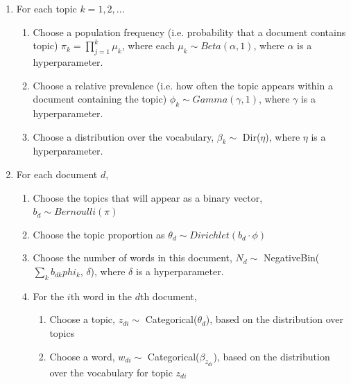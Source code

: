 \documentclass{article}
\begin{document}
\begin{enumerate}
\item For each topic $k = 1, 2, ...$
\begin{enumerate}
\item Choose a population frequency (i.e. probability that a document contains topic) $\pi_k = \prod^k_{j=1} \mu_k$, where each $\mu_k \sim Beta(\alpha, 1)$, where $\alpha$ is a hyperparameter.
\item Choose a relative prevalence (i.e. how often the topic appears within a document containing the topic) $\phi_k \sim Gamma(\gamma, 1)$, where $\gamma$ is a hyperparameter.
\item Choose a distribution over the vocabulary, $\beta_k \sim$ Dir($\eta$), where $\eta$ is a hyperparameter.
\end{enumerate}
\item For each document $d$,
\begin{enumerate}
\item Choose the topics that will appear as a binary vector, $b_d \sim Bernoulli(\pi)$
\item Choose the topic proportion as $\theta_d \sim Dirichlet(b_d\cdot \phi)$
\item Choose the number of words in this document, $N_d \sim$ NegativeBin($\sum_k b_{dk}phi_k$, $\delta$), where $\delta$ is a hyperparameter.
\item For the $i$th word in the $d$th document,
\begin{enumerate}
\item Choose a topic, $z_{di} \sim$ Categorical($\theta_d$), based on the distribution over topics
\item Choose a word, $w_{di} \sim$ Categorical($\beta_{z_{di}}$), based on the distribution over the vocabulary for topic $z_{di}$
\end{enumerate}
\end{enumerate}
\end{enumerate}
\end{document}
